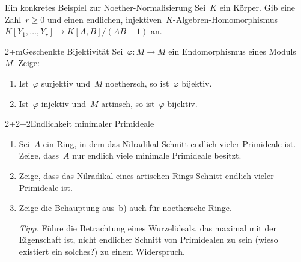 \documentclass{uebblatt}
\begin{document}

\begin{aufgabe}{4}{Ein konkretes Beispiel zur Noether-Normalisierung}
Sei~$K$ ein Körper. Gib eine Zahl~$r \geq 0$ und einen endlichen,
injektiven~$K$-Algebren-Homomorphismus~$K[Y_1,\ldots,Y_r] \to K[A,B]/(AB-1)$
an.
\end{aufgabe}

\begin{aufgabe}{2+m}{Geschenkte Bijektivität}
Sei~$\varphi : M \to M$ ein Endomorphismus eines Moduls~$M$. Zeige:
\begin{enumerate}
\item Ist~$\varphi$ surjektiv und~$M$ noethersch, so ist~$\varphi$ bijektiv.
\item Ist~$\varphi$ injektiv und~$M$ artinsch, so ist~$\varphi$ bijektiv.
\end{enumerate}
\end{aufgabe}

\begin{aufgabe}{2+2+2}{Endlichkeit minimaler Primideale}
\begin{enumerate}
\item Sei~$A$ ein Ring, in dem das Nilradikal Schnitt endlich vieler Primideale
ist. Zeige, dass~$A$ nur endlich viele minimale Primideale besitzt.
\item Zeige, dass das Nilradikal eines artischen Rings Schnitt
endlich vieler Primideale ist.
\item Zeige die Behauptung aus~b) auch für noethersche Ringe.

{\scriptsize\emph{Tipp.} Führe die Betrachtung eines Wurzelideals, das maximal
mit der Eigenschaft ist, nicht endlicher Schnitt von Primidealen zu sein (wieso
existiert ein solches?) zu einem Widerspruch.\par}
\end{enumerate}
\end{aufgabe}
\end{document}
